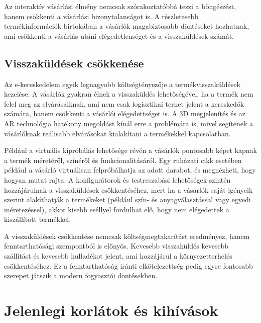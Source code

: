 \documentclass[12pt]{report}
\begin{document}
        Az interaktív vásárlási élmény nemcsak szórakoztatóbbá teszi a böngészést, hanem csökkenti a vásárlási bizonytalanságot is. A részletesebb termékinformációk birtokában a vásárlók magabiztosabb döntéseket hozhatnak, ami csökkenti a vásárlás utáni elégedetlenséget és a visszaküldések számát.
        
        \subsection{Visszaküldések csökkenése}

        Az e-kereskedelem egyik legnagyobb költségtényezője a termékvisszaküldések kezelése. A vásárlók gyakran élnek a visszaküldés lehetőségével, ha a termék nem felel meg az elvárásaiknak, ami nem csak logisztikai terhet jelent a kereskedők számára, hanem csökkenti a vásárlói elégedettséget is. A 3D megjelenítés és az AR technológia hatékony megoldást kínál erre a problémára is, mivel segítenek a vásárlóknak reálisabb elvárásokat kialakítani a termékekkel kapcsolatban.

        Például a virtuális kipróbálás lehetősége révén a vásárlók pontosabb képet kapnak a termék méretéről, színéről és funkcionalitásáról. Egy ruházati cikk esetében például a vásárló virtuálisan felpróbálhatja az adott darabot, és megnézheti, hogy hogyan mutat rajta. A konfigurátorok és testreszabási lehetőségek szintén hozzájárulnak a visszaküldések csökkentéséhez, mert ha a vásárlók saját igényeik szerint alakíthatják a termékeket (például szín- és anyagválasztással vagy egyedi méretezéssel), akkor kisebb eséllyel fordulhat elő, hogy nem elégedettek a kiszállított termékkel.
        
        A visszaküldések csökkentése nemcsak költségmegtakarítást eredményez, hanem fenntarthatósági szempontból is előnyös. Kevesebb visszaküldés kevesebb szállítást és kevesebb hulladékot jelent, ami hozzájárul a környezetterhelés csökkentéséhez. Ez a fenntarthatóság iránti elkötelezettség pedig egyre fontosabb szerepet játszik a modern fogyasztói döntésekben.

        
        \section{Jelenlegi korlátok és kihívások}
\end{document}
